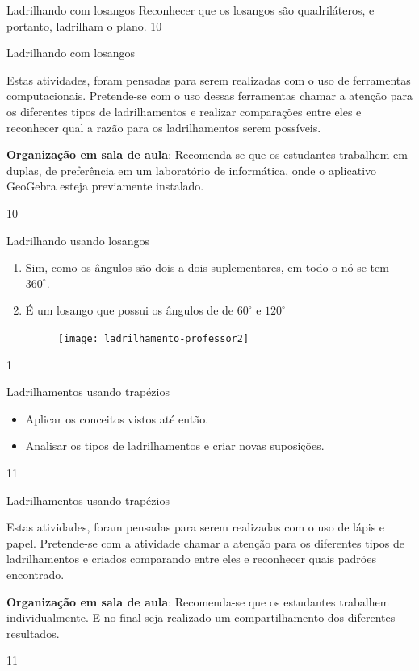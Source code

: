 \def\currentcolor{session2}
\begin{objectives}{Ladrilhando com losangos}
{
	Reconhecer que os losangos são quadriláteros, e portanto, ladrilham o plano.	
}{1}{0}
\end{objectives}
\begin{sugestions}{Ladrilhando com losangos}
{
	Estas atividades, foram pensadas para serem realizadas com o uso de ferramentas computacionais. Pretende-se com o uso dessas ferramentas chamar a atenção para os diferentes tipos de ladrilhamentos e realizar comparações entre eles e reconhecer qual a razão para os ladrilhamentos serem possíveis. 

	\textbf{Organização em sala de aula}: Recomenda-se que os estudantes trabalhem em duplas, de preferência em um laboratório de informática, onde o aplicativo GeoGebra esteja previamente instalado.
}{1}{0}
\end{sugestions}
\begin{answer}{Ladrilhando usando losangos}
{
	\begin{enumerate}
	\item Sim, como os ângulos são dois a dois suplementares, em todo o nó se tem $360^{\circ}$.
	\item É um losango que possui os ângulos de de $60^{\circ}$ e $120^{\circ}$
	\begin{figure}[H]
	\centering
	
	\texttt{[image: ladrilhamento-professor2]}
	\end{figure}
	\end{enumerate}
}{1}
\end{answer}
\clearmargin
\begin{objectives}{Ladrilhamentos usando trapézios}
{
	\begin{itemize}
	\item Aplicar os conceitos vistos até então.
	\item Analisar os tipos de ladrilhamentos e criar novas suposições.
	\end{itemize}
}{1}{1}
\end{objectives}
\begin{sugestions}{Ladrilhamentos usando trapézios}
{
	Estas atividades, foram pensadas para serem realizadas com o uso de lápis e papel. Pretende-se com a atividade chamar a atenção para os diferentes tipos de ladrilhamentos e criados comparando entre eles e reconhecer quais padrões encontrado. 

	\textbf{Organização em sala de aula}: Recomenda-se que os estudantes trabalhem individualmente. E no final seja realizado um compartilhamento dos diferentes resultados.
}{1}{1}
\end{sugestions}
